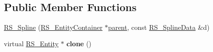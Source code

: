\subsection*{Public Member Functions}
\begin{DoxyCompactItemize}
\item 
\hyperlink{classRS__Spline_a7d04b0f29bb997cd7c39c8b3608b3f5c}{R\-S\-\_\-\-Spline} (\hyperlink{classRS__EntityContainer}{R\-S\-\_\-\-Entity\-Container} $\ast$\hyperlink{classRS__Entity_a80358a8d2fc6739a516a278dc500b49f}{parent}, const \hyperlink{classRS__SplineData}{R\-S\-\_\-\-Spline\-Data} \&d)
\item 
\hypertarget{classRS__Spline_a03bf4749d8f28c45239ec51debc73e0c}{virtual \hyperlink{classRS__Entity}{R\-S\-\_\-\-Entity} $\ast$ {\bfseries clone} ()}\label{classRS__Spline_a03bf4749d8f28c45239ec51debc73e0c}


\end{DoxyCompactItemize}

